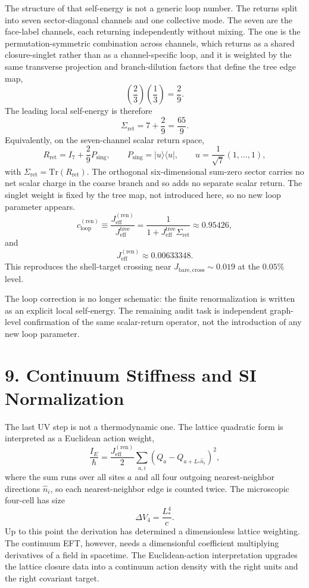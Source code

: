 \documentclass[11pt]{article}
\begin{document}
The structure of that self-energy is not a generic loop number. The returns split into seven sector-diagonal channels and one collective mode. The seven are the face-label channels, each returning independently without mixing. The one is the permutation-symmetric combination across channels, which returns as a shared closure-singlet rather than as a channel-specific loop, and it is weighted by the same transverse projection and branch-dilution factors that define the tree edge map,
\[
\left(\frac{2}{3}\right)\left(\frac{1}{3}\right)=\frac{2}{9}.
\]
The leading local self-energy is therefore
\[
\Sigma_{\mathrm{ret}}=7+\frac{2}{9}=\frac{65}{9}.
\]
Equivalently, on the seven-channel scalar return space,
\[
R_{\mathrm{ret}}=I_7+\frac{2}{9}P_{\mathrm{sing}},
\qquad
P_{\mathrm{sing}}=|u\rangle\langle u|,
\qquad
u=\frac{1}{\sqrt7}(1,\ldots,1),
\]
with $\Sigma_{\mathrm{ret}}=\mathrm{Tr}(R_{\mathrm{ret}})$. The orthogonal six-dimensional sum-zero sector carries no net scalar charge in the coarse branch and so adds no separate scalar return. The singlet weight is fixed by the tree map, not introduced here, so no new loop parameter appears.
\[
c_{\mathrm{loop}}^{(\mathrm{ren})}
\equiv
\frac{J_{\mathrm{eff}}^{(\mathrm{ren})}}{J_{\mathrm{eff}}^{\mathrm{tree}}}
=
\frac{1}{1+J_{\mathrm{eff}}^{\mathrm{tree}}\Sigma_{\mathrm{ret}}}
\approx 0.95426,
\]
and
\[
J_{\mathrm{eff}}^{(\mathrm{ren})}\approx 0.00633348.
\]
This reproduces the shell-target crossing near $J_{\mathrm{bare,cross}}\sim 0.019$ at the $0.05\%$ level.

The loop correction is no longer schematic: the finite renormalization is written as an explicit local self-energy. The remaining audit task is independent graph-level confirmation of the same scalar-return operator, not the introduction of any new loop parameter.

\section{9. Continuum Stiffness and SI Normalization}

The last UV step is not a thermodynamic one. The lattice quadratic form is interpreted as a Euclidean action weight,
\[
\frac{I_E}{\hbar}
=
\frac{J_{\mathrm{eff}}^{(\mathrm{ren})}}{2}
\sum_{a,i}(Q_a-Q_{a+L_*\hat n_i})^2,
\]
where the sum runs over all sites $a$ and all four outgoing nearest-neighbor directions $\hat n_i$, so each nearest-neighbor edge is counted twice. The microscopic four-cell has size
\[
\Delta V_4=\frac{L_*^4}{c}.
\]
Up to this point the derivation has determined a dimensionless lattice weighting. The continuum EFT, however, needs a dimensionful coefficient multiplying derivatives of a field in spacetime. The Euclidean-action interpretation upgrades the lattice closure data into a continuum action density with the right units and the right covariant target.
\end{document}
